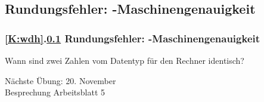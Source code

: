 \documentclass[9pt,german]{beamer}%
\begin{document}
\def\stitle{Rundungsfehler: -Maschinengenauigkeit}
\subsection{\stitle}\label{S:Maschinengenauigkeit1}
\begin{frame}[t]%
 \frametitle{\ref{K:wdh}.\ref{S:Maschinengenauigkeit1} \stitle}
\medskip

Wann sind zwei Zahlen vom Datentyp  f\"ur den Rechner identisch?


\end{frame}


\setcounter{exercise}{14}

\setcounter{exercise}{15}

\setcounter{exercise}{16}


\begin{frame}
\centering
\Huge{}
\vspace{2cm}

{\LARGE
N\"achste \"Ubung: 20. November\\
Besprechung Arbeitsblatt 5
}
\end{frame}


\end{document}
